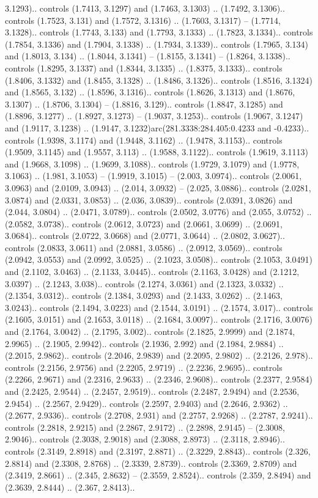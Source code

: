 3.1293).. controls (1.7413, 3.1297) and (1.7463, 3.1303) .. (1.7492, 3.1306).. controls (1.7523, 3.131) and (1.7572, 3.1316) .. (1.7603, 3.1317) -- (1.7714, 3.1328).. controls (1.7743, 3.133) and (1.7793, 3.1333) .. (1.7823, 3.1334).. controls (1.7854, 3.1336) and (1.7904, 3.1338) .. (1.7934, 3.1339).. controls (1.7965, 3.134) and (1.8013, 3.134) .. (1.8044, 3.1341) -- (1.8155, 3.1341) -- (1.8264, 3.1338).. controls (1.8295, 3.1337) and (1.8344, 3.1335) .. (1.8375, 3.1333).. controls (1.8406, 3.1332) and (1.8455, 3.1328) .. (1.8486, 3.1326).. controls (1.8516, 3.1324) and (1.8565, 3.132) .. (1.8596, 3.1316).. controls (1.8626, 3.1313) and (1.8676, 3.1307) .. (1.8706, 3.1304) -- (1.8816, 3.129).. controls (1.8847, 3.1285) and (1.8896, 3.1277) .. (1.8927, 3.1273) -- (1.9037, 3.1253).. controls (1.9067, 3.1247) and (1.9117, 3.1238) .. (1.9147, 3.1232)arc(281.3338:284.405:0.4233 and -0.4233).. controls (1.9398, 3.1174) and (1.9448, 3.1162) .. (1.9478, 3.1153).. controls (1.9509, 3.1145) and (1.9557, 3.113) .. (1.9588, 3.1122).. controls (1.9619, 3.1113) and (1.9668, 3.1098) .. (1.9699, 3.1088).. controls (1.9729, 3.1079) and (1.9778, 3.1063) .. (1.981, 3.1053) -- (1.9919, 3.1015) -- (2.003, 3.0974).. controls (2.0061, 3.0963) and (2.0109, 3.0943) .. (2.014, 3.0932) -- (2.025, 3.0886).. controls (2.0281, 3.0874) and (2.0331, 3.0853) .. (2.036, 3.0839).. controls (2.0391, 3.0826) and (2.044, 3.0804) .. (2.0471, 3.0789).. controls (2.0502, 3.0776) and (2.055, 3.0752) .. (2.0582, 3.0738).. controls (2.0612, 3.0723) and (2.0661, 3.0699) .. (2.0691, 3.0684).. controls (2.0722, 3.0668) and (2.0771, 3.0644) .. (2.0802, 3.0627).. controls (2.0833, 3.0611) and (2.0881, 3.0586) .. (2.0912, 3.0569).. controls (2.0942, 3.0553) and (2.0992, 3.0525) .. (2.1023, 3.0508).. controls (2.1053, 3.0491) and (2.1102, 3.0463) .. (2.1133, 3.0445).. controls (2.1163, 3.0428) and (2.1212, 3.0397) .. (2.1243, 3.038).. controls (2.1274, 3.0361) and (2.1323, 3.0332) .. (2.1354, 3.0312).. controls (2.1384, 3.0293) and (2.1433, 3.0262) .. (2.1463, 3.0243).. controls (2.1494, 3.0223) and (2.1544, 3.0191) .. (2.1574, 3.017).. controls (2.1605, 3.0151) and (2.1653, 3.0118) .. (2.1684, 3.0097).. controls (2.1716, 3.0076) and (2.1764, 3.0042) .. (2.1795, 3.002).. controls (2.1825, 2.9999) and (2.1874, 2.9965) .. (2.1905, 2.9942).. controls (2.1936, 2.992) and (2.1984, 2.9884) .. (2.2015, 2.9862).. controls (2.2046, 2.9839) and (2.2095, 2.9802) .. (2.2126, 2.978).. controls (2.2156, 2.9756) and (2.2205, 2.9719) .. (2.2236, 2.9695).. controls (2.2266, 2.9671) and (2.2316, 2.9633) .. (2.2346, 2.9608).. controls (2.2377, 2.9584) and (2.2425, 2.9544) .. (2.2457, 2.9519).. controls (2.2487, 2.9494) and (2.2536, 2.9454) .. (2.2567, 2.9429).. controls (2.2597, 2.9403) and (2.2646, 2.9362) .. (2.2677, 2.9336).. controls (2.2708, 2.931) and (2.2757, 2.9268) .. (2.2787, 2.9241).. controls (2.2818, 2.9215) and (2.2867, 2.9172) .. (2.2898, 2.9145) -- (2.3008, 2.9046).. controls (2.3038, 2.9018) and (2.3088, 2.8973) .. (2.3118, 2.8946).. controls (2.3149, 2.8918) and (2.3197, 2.8871) .. (2.3229, 2.8843).. controls (2.326, 2.8814) and (2.3308, 2.8768) .. (2.3339, 2.8739).. controls (2.3369, 2.8709) and (2.3419, 2.8661) .. (2.345, 2.8632) -- (2.3559, 2.8524).. controls (2.359, 2.8494) and (2.3639, 2.8444) .. (2.367, 2.8413).. 